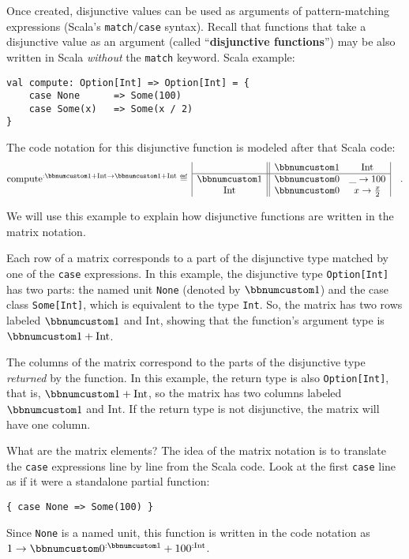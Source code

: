 Once created, disjunctive values can be used as arguments of pattern-matching
expressions (Scala\textsf{'}s \lstinline!match!/\lstinline!case! syntax).
Recall that functions that take a disjunctive value as an argument
(called \textsf{``}\textbf{disjunctive functions}\textsf{''})
may be also written in Scala \emph{without} the \lstinline!match!
keyword. Scala example:
\begin{lstlisting}
val compute: Option[Int] => Option[Int] = {
    case None      => Some(100)
    case Some(x)   => Some(x / 2)
}
\end{lstlisting}
The code notation for this disjunctive function is modeled after that
Scala code:
\[
\text{compute}^{:\bbnum 1+\text{Int}\rightarrow\bbnum 1+\text{Int}}\triangleq\,\begin{array}{|c||cc|}
 & \bbnum 1 & \text{Int}\\
\hline \bbnum 1 & \bbnum 0 & \_\rightarrow100\\
\text{Int} & \bbnum 0 & x\rightarrow\frac{x}{2}
\end{array}\quad.
\]

We will use this example to explain how disjunctive functions are
written in the matrix notation.

Each row of a matrix corresponds to a part of the disjunctive type
matched by one of the \lstinline!case! expressions. In this example,
the disjunctive type \lstinline!Option[Int]! has two parts: the named
unit \lstinline!None! (denoted by $\bbnum 1$) and the case class
\lstinline!Some[Int]!, which is equivalent to the type \lstinline!Int!.
So, the matrix has two rows labeled $\bbnum 1$ and $\text{Int}$,
showing that the function\textsf{'}s argument type is $\bbnum 1+\text{Int}$.

The columns of the matrix correspond to the parts of the disjunctive
type \emph{returned} by the function. In this example, the return
type is also \lstinline!Option[Int]!, that is, $\bbnum 1+\text{Int}$,
so the matrix has two columns labeled $\bbnum 1$ and $\text{Int}$.
If the return type is not disjunctive, the matrix will have one column.

What are the matrix elements? The idea of the matrix notation is to
translate the \lstinline!case! expressions line by line from the
Scala code. Look at the first \lstinline!case! line as if it were
a standalone partial function:
\begin{lstlisting}
{ case None => Some(100) }
\end{lstlisting}
Since \lstinline!None! is a named unit, this function is written
in the code notation as $1\rightarrow\bbnum 0^{:\bbnum 1}+100^{:\text{Int}}$. 

